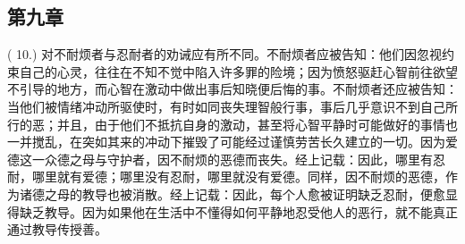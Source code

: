 
\subsection{第九章}

\par

( 10.) 对不耐烦者与忍耐者的劝诫应有所不同。不耐烦者应被告知：他们因忽视约束自己的心灵，往往在不知不觉中陷入许多罪的险境；因为愤怒驱赶心智前往欲望不引导的地方，而心智在激动中做出事后知晓便后悔的事。不耐烦者还应被告知：当他们被情绪冲动所驱使时，有时如同丧失理智般行事，事后几乎意识不到自己所行的恶；并且，由于他们不抵抗自身的激动，甚至将心智平静时可能做好的事情也一并搅乱，在突如其来的冲动下摧毁了可能经过谨慎劳苦长久建立的一切。因为爱德这一众德之母与守护者，因不耐烦的恶德而丧失。经上记载：因此，哪里有忍耐，哪里就有爱德；哪里没有忍耐，哪里就没有爱德。同样，因不耐烦的恶德，作为诸德之母的教导也被消散。经上记载：因此，每个人愈被证明缺乏忍耐，便愈显得缺乏教导。因为如果他在生活中不懂得如何平静地忍受他人的恶行，就不能真正通过教导传授善。\par

